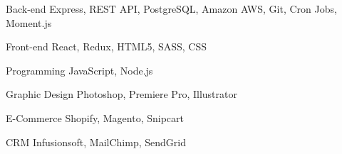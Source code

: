 

\begin{cvskills}

  \cvskill
    {Back-end} %
    {Express, REST API, PostgreSQL, Amazon AWS, Git, Cron Jobs, Moment.js} %

  \cvskill
    {Front-end} %
    {React, Redux, HTML5, SASS, CSS} %

  \cvskill
    {Programming} %
    {JavaScript, Node.js} %

  \cvskill
    {Graphic Design} %
    {Photoshop, Premiere Pro, Illustrator} %

  \cvskill
      {E-Commerce} %
      {Shopify, Magento, Snipcart} %

\cvskill
    {CRM} %
    {Infusionsoft, MailChimp, SendGrid} %

\end{cvskills}


